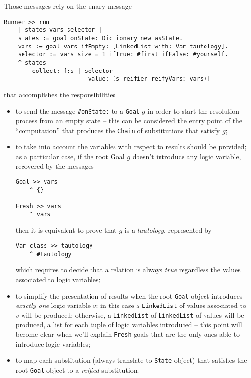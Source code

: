 \documentclass[a4paper,11pt]{article}
\newcommand{\ct}[1]{{\textsf{#1}}\xspace}
\begin{document}
Those messages rely on the unary message
\begin{verbatim}
Runner >> run
    | states vars selector |
    states := goal onState: Dictionary new asState.
    vars := goal vars ifEmpty: [LinkedList with: Var tautology].
    selector := vars size = 1 ifTrue: #first ifFalse: #yourself.
    ^ states
        collect: [:s | selector
                        value: (s reifier reifyVars: vars)]
\end{verbatim}
that accomplishes the responsibilities
\begin{itemize}

\item to send the message \Verb|#onState:| to a \Verb|Goal| $g$ in order to
start the resolution process from an empty state -- this can be considered the
entry point of the ``computation'' that produces the \Verb|Chain| of
substitutions that satisfy $g$;

\item to take into account the variables with respect to results should be
provided; as a particular case, if the root \ct{Goal} $g$ doesn't introduce any logic
variable, recovered by the messages
\begin{verbatim}
Goal >> vars
    ^ {}

Fresh >> vars
    ^ vars
\end{verbatim}
then it is equivalent to prove that $g$ is a \textit{tautology}, represented
by
\begin{verbatim}
Var class >> tautology
    ^ #tautology
\end{verbatim}
which requires to decide that a relation is always \textit{true} regardless
the values associated to logic variables;

\item to simplify the presentation of results when the root \Verb|Goal| object
introduces \textit{exactly one} logic variable $v$: in this case a
\Verb|LinkedList| of values associated to $v$ will be produced; otherwise, a
\Verb|LinkedList| of \Verb|LinkedList| of values will be produced, a list for
each tuple of logic variables introduced -- this point will become clear when
we'll explain \Verb|Fresh| goals that are the only ones able to introduce logic
variables;

\item to map each substitution (always translate to \Verb|State| object) that
satisfies the root \Verb|Goal| object to a \textit{reified} substitution.
\end{itemize}
\end{document}
